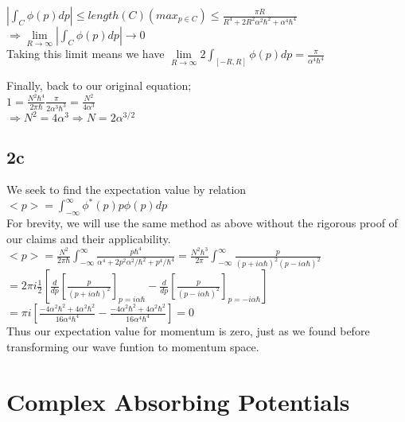 \documentclass{article}
\begin{document}
$|{\displaystyle\int_{C}}\phi(p)dp|\leq length(C)({max}_{p\in C})\leq\frac{\pi R}{R^4+2R^2\alpha^2\hbar^2+\alpha^4\hbar^4}$\\

$\Rightarrow \lim\limits_{R\rightarrow\infty}|{\displaystyle\int_{C}}\phi(p)dp|\rightarrow0$\\

Taking this limit means we have $\lim\limits_{R\rightarrow\infty}2{\displaystyle \int_{[-R,R]}}\phi(p)dp=\frac{\pi}{\alpha^4\hbar^4}$

Finally, back to our original equation;\\

$1=\frac{N^2\hbar^4}{2\pi\hbar}\frac{\pi}{2\alpha^3\hbar^3}=\frac{N^2}{4\alpha^3}$\\

$\Rightarrow N^2=4\alpha^3\Longrightarrow N=2\alpha^{3/2}$

\subsection*{2c}

We seek to find the expectation value by relation $<p>={\displaystyle \int_{-\infty}^{\infty} }\phi^*(p) p \phi(p) dp$\\

For brevity, we will use the same method as above without the rigorous proof of our claims and their applicability.\\ 

$<p>=\frac{N^2}{2\pi\hbar}{\displaystyle \int_{-\infty}^{\infty} }\frac{p\hbar^4}{\alpha^4+2p^2\alpha^2/\hbar^2+p^4/\hbar^4}=\frac{N^2\hbar^3}{2\pi}{\displaystyle \int_{-\infty}^{\infty}}\frac{p}{(p+i\alpha\hbar)^2(p-i\alpha\hbar)^2}$\\

$=2\pi i\frac{1}{2}[\frac{d}{dp}[\frac{p}{(p+i\alpha\hbar)^2}]_{p=i\alpha\hbar}-\frac{d}{dp}[\frac{p}{(p-i\alpha\hbar)^2}]_{p=-i\alpha\hbar}]$\\

$=\pi i[\frac{-4\alpha^2\hbar^2+4\alpha^2\hbar^2}{16\alpha^4\hbar^4}-\frac{-4\alpha^2\hbar^2+4\alpha^2\hbar^2}{16\alpha^4\hbar^4}]=0$\\

Thus our expectation value for momentum is zero, just as we found before transforming our wave funtion to momentum space.\\

\section*{Complex Absorbing Potentials}
\end{document}
